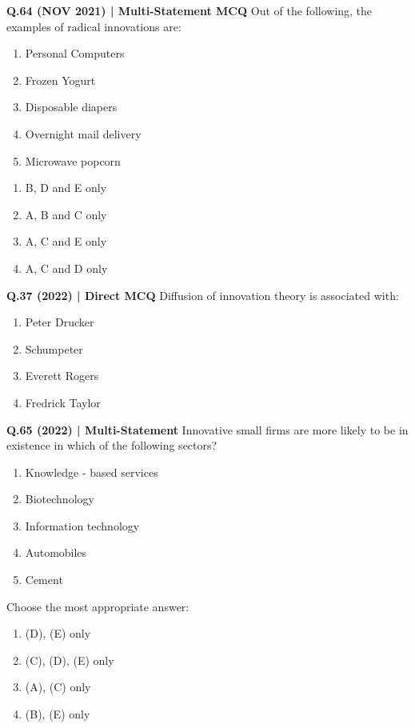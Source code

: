 \documentclass{article}
\begin{document}
\textbf{Q.64 (NOV 2021) | Multi-Statement MCQ}
Out of the following, the examples of radical innovations are:
\begin{enumerate}[label=\Alph*.]
    \item Personal Computers
    \item Frozen Yogurt
    \item Disposable diapers
    \item Overnight mail delivery
    \item Microwave popcorn
\end{enumerate}
\begin{enumerate}[label=(\arabic*)]
    \item B, D and E only
    \item A, B and C only
    \item A, C and E only
    \item A, C and D only
\end{enumerate}

\textbf{Q.37 (2022) | Direct MCQ}
Diffusion of innovation theory is associated with:
\begin{enumerate}[label=(\arabic*)]
    \item Peter Drucker
    \item Schumpeter
    \item Everett Rogers
    \item Fredrick Taylor
\end{enumerate}

\textbf{Q.65 (2022) | Multi-Statement}
Innovative small firms are more likely to be in existence in which of the following sectors?
\begin{enumerate}[label=\Alph*.]
    \item Knowledge - based services
    \item Biotechnology
    \item Information technology
    \item Automobiles
    \item Cement
\end{enumerate}
Choose the most appropriate answer:
\begin{enumerate}[label=(\arabic*)]
    \item (D), (E) only
    \item (C), (D), (E) only
    \item (A), (C) only
    \item (B), (E) only
\end{enumerate}
\end{document}
